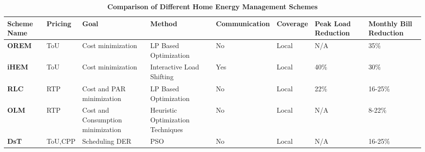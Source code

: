 \documentclass[journal]{IEEEtran}
\begin{document}
\begin{table*}[t]
\centering
\caption{\bf Comparison of Different Home Energy Management Schemes}
\begin{tabular}{|m{1.5cm}|m{1cm}|m{1.7cm}|m{1.5cm}|m{1.6cm}|m{1.2cm}|m{1.3cm}|m{1.3cm}|}
\hline
\textbf{Scheme Name} & Pricing & Goal &  Method & Communication & Coverage & Peak Load Reduction & Monthly Bill Reduction \\
\hline
\textbf{OREM} & {ToU} & Cost minimization & LP Based Optimization & No & Local & N/A & 35\% \\
\hline
\textbf{iHEM} & {ToU} & Cost minimization & Interactive Load Shifting & Yes & Local & 40\% & 30\% \\
\hline
\textbf{RLC} & {RTP} & Cost and PAR minimization & LP Based Optimization & No & Local & 22\% & 16-25\% \\
\hline
\textbf{OLM} & {RTP} & Cost and Consumption minimization & Heuristic Optimization Techniques & No & Local  & N/A & 8-22\% \\
\hline
\textbf{DsT} & {ToU,CPP} & Scheduling DER & PSO & No & Local & N/A & 16-25\% \\
\hline

\end{tabular}
\label{tab:template}
\end{table*}
\end{document}
